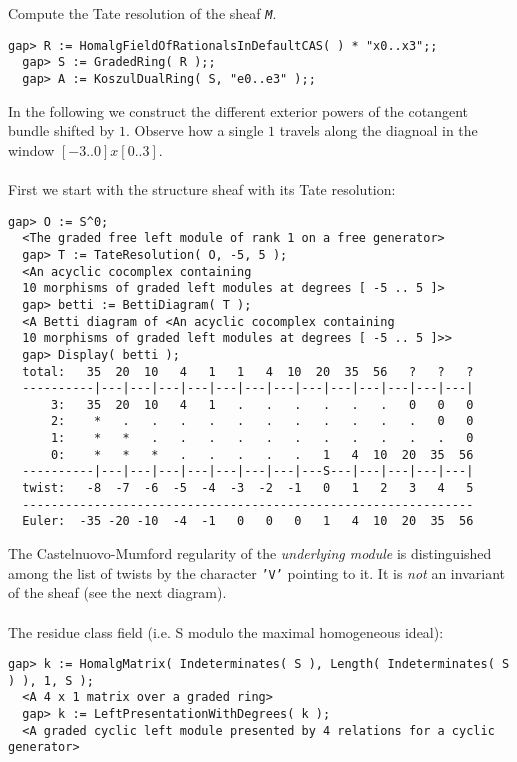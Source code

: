 \documentclass[a4paper,11pt]{report}
\begin{document}
{{{ Compute the Tate resolution of the sheaf \mbox{\texttt{\slshape M}}. 
\begin{Verbatim}[fontsize=\small,frame=single,label=Example]
  gap> R := HomalgFieldOfRationalsInDefaultCAS( ) * "x0..x3";;
  gap> S := GradedRing( R );;
  gap> A := KoszulDualRing( S, "e0..e3" );;
\end{Verbatim}
 In the following we construct the different exterior powers of the cotangent
bundle shifted by $1$. Observe how a single $1$ travels along the diagnoal in the window $[ -3 .. 0 ] x [ 0 .. 3 ]$. \\
\\
 First we start with the structure sheaf with its Tate resolution: 
\begin{Verbatim}[fontsize=\small,frame=single,label=Example]
  gap> O := S^0;
  <The graded free left module of rank 1 on a free generator>
  gap> T := TateResolution( O, -5, 5 );
  <An acyclic cocomplex containing
  10 morphisms of graded left modules at degrees [ -5 .. 5 ]>
  gap> betti := BettiDiagram( T );
  <A Betti diagram of <An acyclic cocomplex containing 
  10 morphisms of graded left modules at degrees [ -5 .. 5 ]>>
  gap> Display( betti );
  total:   35  20  10   4   1   1   4  10  20  35  56   ?   ?   ?
  ----------|---|---|---|---|---|---|---|---|---|---|---|---|---|
      3:   35  20  10   4   1   .   .   .   .   .   .   0   0   0
      2:    *   .   .   .   .   .   .   .   .   .   .   .   0   0
      1:    *   *   .   .   .   .   .   .   .   .   .   .   .   0
      0:    *   *   *   .   .   .   .   .   1   4  10  20  35  56
  ----------|---|---|---|---|---|---|---|---S---|---|---|---|---|
  twist:   -8  -7  -6  -5  -4  -3  -2  -1   0   1   2   3   4   5
  ---------------------------------------------------------------
  Euler:  -35 -20 -10  -4  -1   0   0   0   1   4  10  20  35  56
\end{Verbatim}
 The Castelnuovo-Mumford regularity of the \emph{underlying module} is distinguished among the list of twists by the character \texttt{'V'} pointing to it. It is \emph{not} an invariant of the sheaf (see the next diagram). \\
\\
 The residue class field (i.e. S modulo the maximal homogeneous ideal): 
\begin{Verbatim}[fontsize=\small,frame=single,label=Example]
  gap> k := HomalgMatrix( Indeterminates( S ), Length( Indeterminates( S ) ), 1, S );
  <A 4 x 1 matrix over a graded ring>
  gap> k := LeftPresentationWithDegrees( k );
  <A graded cyclic left module presented by 4 relations for a cyclic generator>

\end{Verbatim}}}}
\end{document}
